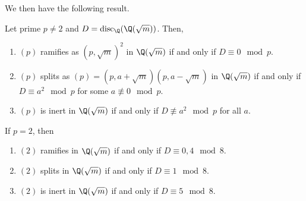 \documentclass[11pt,leqno,oneside]{amsart}
\numberwithin{thm}{section}
\newcommand{\disc}{\operatorname{disc}}
\begin{document}
We then have the following result.
\begin{thm}
  \cite{mack-crane} Let prime \(p \neq 2\) and \(D = \disc_\Q(\Q(\sqrt{m}))\). Then,
  \begin{enumerate}
  \item \((p)\) ramifies as \((p,\sqrt{m})^2\) in \(\Q(\sqrt{m})\) if
    and only if \(D \equiv 
    0 \mod p\).
  \item \((p)\) splits as \((p) = (p,a+\sqrt{m})(p,a-\sqrt{m})\) in
    \(\Q(\sqrt{m})\) if and only if \(D \equiv 
    a^2 \mod p\) for some \(a \not \equiv 0 \mod p\).
  \item \((p)\) is inert in \(\Q(\sqrt{m})\) if and only if \(D \not
    \equiv a^2 \mod p\) for all \(a\).
  \end{enumerate}
  If \(p = 2\), then
  \begin{enumerate}
  \item \((2)\) ramifies in \(\Q(\sqrt{m})\) if and only if \(D \equiv
    0,4 \mod 8\).
  \item \((2)\) splits in \(\Q(\sqrt{m})\) if and only if \(D \equiv 1
    \mod 8\).
  \item \((2)\) is inert in \(\Q(\sqrt{m})\) if and only if \(D \equiv
    5 \mod 8\).
  \end{enumerate}
\end{thm}
\end{document}
